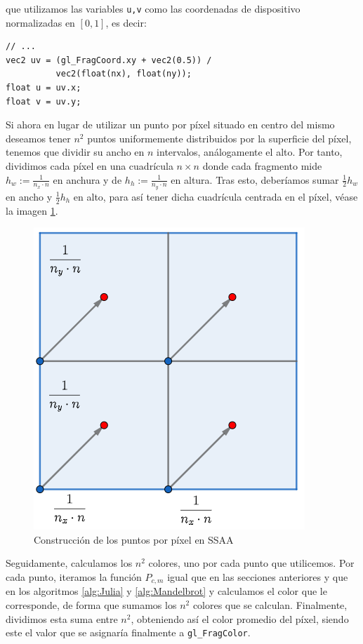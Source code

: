 que utilizamos las variables \verb|u,v| como las coordenadas de dispositivo normalizadas en $[0,1]$, es decir:

\begin{lstlisting}
// ... 
vec2 uv = (gl_FragCoord.xy + vec2(0.5)) / 
          vec2(float(nx), float(ny));
float u = uv.x;
float v = uv.y;
\end{lstlisting}

Si ahora en lugar de utilizar un punto por píxel situado en centro del mismo deseamos tener $n^2$ puntos uniformemente distribuidos por la superficie del píxel, tenemos que dividir su ancho en $n$ intervalos, análogamente el alto. Por tanto, dividimos cada píxel en una cuadrícula $n\times n$ donde cada fragmento mide $h_w:=\frac{1}{n_x\cdot n}$ en anchura y de $h_h:=\frac{1}{n_y\cdot n}$ en altura. Tras esto, deberíamos sumar $\frac{1}{2}h_w$ en ancho y $\frac{1}{2}h_h$ en alto, para así tener dicha cuadrícula centrada en el píxel, véase la imagen \ref{fig:SSAA}.

\begin{figure} [ht]
  \centering
  \includegraphics[scale = 0.45]{img/C6/SSAA.png}
  \caption{Construcción de los puntos por píxel en SSAA}
  \label{fig:SSAA}
\end{figure}

Seguidamente, calculamos los $n^2$ colores, uno por cada punto que utilicemos. Por cada punto, iteramos la función $P_{c,m}$ igual que en las secciones anteriores y que en los algoritmos \ref{alg:Julia} y \ref{alg:Mandelbrot} y calculamos el color que le corresponde, de forma que sumamos los $n^2$ colores que se calculan.  Finalmente, dividimos esta suma entre $n^2$, obteniendo así el color promedio del píxel, siendo este el valor que se asignaría finalmente a \verb|gl_FragColor|.

